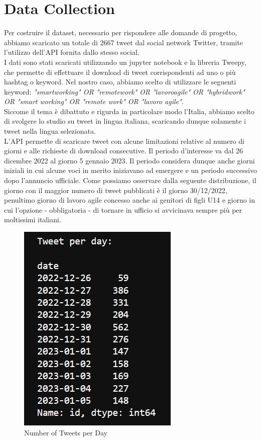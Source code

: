 \documentclass[12pt,journal,compsoc]{IEEEtran}
\begin{document}
\section{Data Collection}
Per costruire il dataset, necessario per rispondere alle domande di progetto, abbiamo scaricato un totale di 2667 tweet dal social network Twitter, tramite l'utilizzo dell'API fornita dallo stesso social.\\
I dati sono stati scaricati utilizzando un jupyter notebook e la libreria Tweepy, che permette di effettuare il download di tweet corrispondenti ad uno o più hashtag o keyword. Nel nostro caso, abbiamo scelto di utilizzare le seguenti keyword: \textit{"smartworking" OR "remotework" OR "lavoroagile" OR "hybridwork" OR "smart working" OR "remote work" OR "lavoro agile"}.\\
Siccome il tema è dibattuto e rigurda in particolare modo l'Italia, abbiamo scelto di svolgere lo studio su tweet in lingua italiana, scaricando dunque solamente i tweet nella lingua selezionata.\\
L'API permette di scaricare tweet con alcune limitazioni relative al numero di giorni e alle richieste di download consecutive. Il periodo d'interesse va dal 26 dicembre 2022 al giorno 5 gennaio 2023. Il periodo considera dunque anche giorni iniziali in cui alcune voci in merito iniziavano ad emergere e un periodo successivo dopo l'annuncio ufficiale. Come possiamo osservare dalla seguente distribuzione, il giorno con il maggior numero di tweet pubblicati è il giorno 30/12/2022, penultimo giorno di lavoro agile concesso anche ai genitori di figli U14 e giorno in cui l'opzione - obbligatoria - di tornare in ufficio si avvicinava sempre più per moltissimi italiani.

\begin{figure}[H]
  \begin{center}
  \includegraphics[scale=1]{./images/tweetxday.png}
  \end{center}
  \caption{Number of Tweets per Day}
\end{figure}
\end{document}
